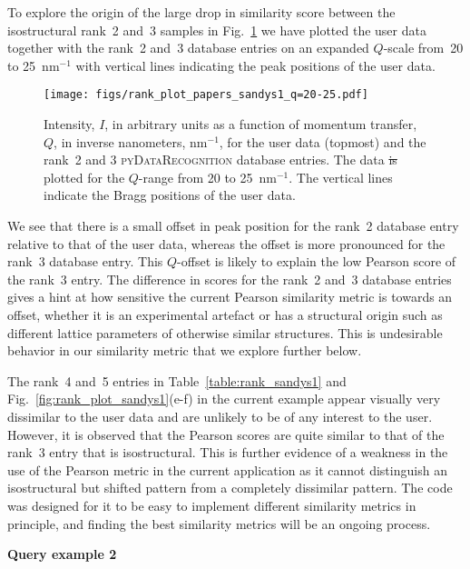 \documentclass[preprint]{iucr}
\newcommand{\fig}[1]{Fig.~\ref{fig:#1}}
\newcommand{\tabl}[1]{Table~\ref{table:#1}}
\newcommand{\pydr}{\textsc{pyDataRecognition}\xspace}
\providecommand{\DIFadd}[1]{{\protect\color{blue}\uwave{#1}}} %
\providecommand{\DIFdel}[1]{{\protect\color{red}\sout{#1}}}                      %
\providecommand{\DIFaddFL}[1]{\DIFadd{#1}} %
\providecommand{\DIFdelFL}[1]{\DIFdel{#1}} %
\providecommand{\DIFaddbeginFL}{} %
\providecommand{\DIFaddendFL}{} %
\providecommand{\DIFdelbeginFL}{} %
\providecommand{\DIFdelendFL}{} %
\newcommand{\DIFscaledelfig}{0.5}
\newlength{\DIFdelgraphicswidth} %
\newlength{\DIFdelgraphicsheight} %
\newcommand{\DIFaddincludegraphics}[2][]{{\color{blue}\fbox{\DIFOincludegraphics[#1]{#2}}}} %
\newcommand{\DIFdelincludegraphics}[2][]{%
\sbox{\DIFdelgraphicsbox}{\DIFOincludegraphics[#1]{#2}}%
\settoboxwidth{\DIFdelgraphicswidth}{\DIFdelgraphicsbox} %
\settoboxtotalheight{\DIFdelgraphicsheight}{\DIFdelgraphicsbox} %
\scalebox{\DIFscaledelfig}{%
\parbox[b]{\DIFdelgraphicswidth}{\usebox{\DIFdelgraphicsbox}\\[-\baselineskip] \rule{\DIFdelgraphicswidth}{0em}}\llap{\resizebox{\DIFdelgraphicswidth}{\DIFdelgraphicsheight}{%
\setlength{\unitlength}{\DIFdelgraphicswidth}%
\begin{picture}(1,1)%
\thicklines\linethickness{2pt} %
{\color[rgb]{1,0,0}\put(0,0){\framebox(1,1){}}}%
{\color[rgb]{1,0,0}\put(0,0){\line( 1,1){1}}}%
{\color[rgb]{1,0,0}\put(0,1){\line(1,-1){1}}}%
\end{picture}%
}\hspace*{3pt}}} %
} %
\DeclareRobustCommand{\DIFaddbeginFL}{\DIFOaddbeginFL \let\includegraphics\DIFaddincludegraphics} %
\DeclareRobustCommand{\DIFaddendFL}{\DIFOaddendFL \let\includegraphics\DIFOincludegraphics} %
\DeclareRobustCommand{\DIFdelbeginFL}{\DIFOdelbeginFL \let\includegraphics\DIFdelincludegraphics} %
\DeclareRobustCommand{\DIFdelendFL}{\DIFOaddendFL \let\includegraphics\DIFOincludegraphics} %
\begin{document}
To explore the origin of the large drop in similarity score between the isostructural rank~2 and~3 samples in \fig{rank_plot_sandys1_zoom} we have plotted the user data together with the rank~2 and~3 database entries on an expanded $Q$-scale from~20 to 25~nm$^{-1}$ with vertical lines indicating the peak positions of the user data. 
% 
\begin{figure}
    \texttt{[image: figs/rank\_plot\_papers\_sandys1\_q=20-25.pdf]}
    \label{fig:rank_plot_sandys1_zoom}
    \caption{Intensity, $I$, in arbitrary units as a function of momentum transfer, $Q$, in inverse nanometers, $\mathrm{nm}^{-1}$, for the user data (topmost) and the rank~2 and 3 \pydr database entries.
    The data \DIFdelbeginFL \DIFdelFL{is }\DIFdelendFL \DIFaddbeginFL \DIFaddFL{are }\DIFaddendFL plotted for the $Q$-range from 20 to 25~nm$^{-1}$.
    The vertical lines indicate the Bragg positions of the user data.}
\end{figure}
% 
We see that there is a small offset in peak position for the rank~2 database entry relative to that of the user data, whereas the offset is more pronounced for the rank~3 database entry. This $Q$-offset is likely to explain the low Pearson score of the rank~3 entry. The difference in scores for the rank~2 and~3 database entries gives a hint at how sensitive the current Pearson similarity metric is towards an offset, whether it is an experimental artefact or has a structural origin such as different lattice parameters of otherwise similar structures.
This is undesirable behavior in our similarity metric that we explore further below. 

The rank~4 and~5 entries in \tabl{rank_sandys1} and \fig{rank_plot_sandys1}(e-f) in the current example appear visually very dissimilar to the user data and are unlikely to be of any interest to the user. However, it is observed that the Pearson scores are quite similar to that of the rank~3 entry that is isostructural.  This is further evidence of a weakness in the use of the Pearson metric in the current application as it cannot distinguish an isostructural but shifted pattern from a completely dissimilar pattern.  The code was designed for it to be easy to implement different similarity metrics in principle, and finding the best similarity metrics will be an ongoing process.

\textbf{Query example 2}
\end{document}
